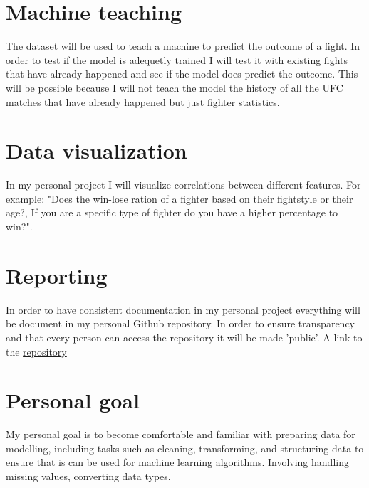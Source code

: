 \documentclass{article}
\begin{document}
\section{Machine teaching}
The dataset will be used to teach a machine to predict the outcome of a fight. In order to test if the model 
is adequetly trained I will test it with existing fights that have already happened and see if the model does predict the outcome. This
will be possible because I will not teach the model the history of all the UFC matches that have already happened but just fighter statistics.

\section{Data visualization}
In my personal project I will visualize correlations between different features. For example: "Does the win-lose ration of a fighter based 
on their fightstyle or their age?, If you are a specific type of fighter do you have a higher percentage to win?".

\section{Reporting}
In order to have consistent documentation in  my personal project everything will be document in my personal Github repository. In order to ensure 
transparency and that every person can access the repository it will be made 'public'. A link to the \href{https://github.com/BurovDanil/MinorAI}{repository}

\section{Personal goal}
My personal goal is to become comfortable and familiar with preparing data for modelling, including tasks such as cleaning, transforming,
and structuring data to ensure that is can be used for machine learning algorithms. Involving handling missing values, converting data types.
\end{document}
